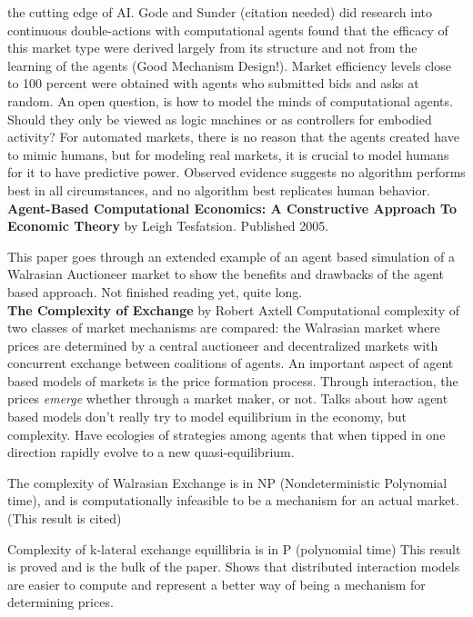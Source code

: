 \documentclass[12pt,twoside]{reedthesis}
\begin{document}
the cutting edge of AI. Gode and Sunder (citation needed) did research into continuous double-actions with computational agents found that the efficacy of this market type were derived largely from its structure and not from the learning of the agents (Good Mechanism Design!). Market efficiency levels close to 100 percent were obtained with agents who submitted bids and asks at random. An open question, is how to model the minds of computational agents. Should they only be viewed as logic machines or as controllers for embodied activity? For automated markets, there is no reason that the agents created have to mimic humans, but for modeling real markets, it is crucial to model humans for it to have predictive power. Observed evidence suggests no algorithm performs best in all circumstances, and no algorithm best replicates human behavior. \cite{Tesfatsion2002} \\

\textbf{Agent-Based Computational Economics: A Constructive Approach To Economic Theory} by Leigh Tesfatsion. Published 2005.

This paper goes through an extended example of an agent based simulation of a Walrasian Auctioneer market to show the benefits and drawbacks of the agent based approach. Not finished reading yet, quite long.
\cite{Tesfatsion2005} \\

\textbf{The Complexity of Exchange} by Robert Axtell
Computational complexity of two classes of market mechanisms are compared: the Walrasian market where prices are determined by a central auctioneer and decentralized markets with concurrent exchange between coalitions of agents. An important aspect of agent based models of markets is the price formation process. Through interaction, the prices \textit{emerge} whether through a market maker, or not. Talks about how agent based models don't really try to model equilibrium in the economy, but complexity. Have ecologies of strategies among agents that when tipped in one direction rapidly evolve to a new quasi-equilibrium. 

The complexity of Walrasian Exchange is in NP (Nondeterministic Polynomial time), and is computationally infeasible to be a mechanism for an actual market. (This result is cited)

Complexity of k-lateral exchange equillibria is in P (polynomial time) This result is proved and is the bulk of the paper. Shows that distributed interaction models are easier to compute and represent a better way of being a mechanism for determining prices.
\cite{Axtell2005}\\
\end{document}
